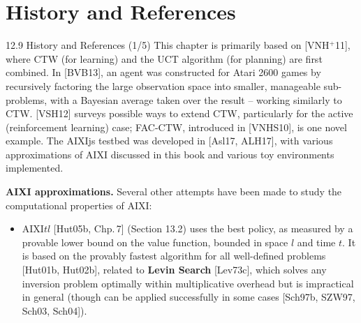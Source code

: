 \documentclass[aspectratio=169,10pt]{beamer}
\begin{document}
\section{History and References}

\begin{frame}{12.9 History and References (1/5)}
This chapter is primarily based on [VNH$^+$11], where CTW (for learning) and the UCT
algorithm (for planning) are first combined. In [BVB13], an agent was constructed for
Atari 2600 games by recursively factoring the large observation space into smaller,
manageable sub-problems, with a Bayesian average taken over the result -- working
similarly to CTW. [VSH12] surveys possible ways to extend CTW, particularly for the active
(reinforcement learning) case; FAC-CTW, introduced in [VNHS10], is one novel example. The
AIXIjs testbed was developed in [Asl17, ALH17], with various approximations of AIXI
discussed in this book and various toy environments implemented.

\textbf{AIXI approximations.} Several other attempts have been made to study the
computational properties of AIXI:
\begin{itemize}
\item AIXI$tl$ [Hut05b, Chp.\,7] (Section 13.2) uses the best policy, as measured by a
provable lower bound on the value function, bounded in space $l$ and time $t$. It is
based on the provably fastest algorithm for all well-defined problems [Hut01b, Hut02b],
related to \textbf{Levin Search} [Lev73c], which solves any inversion problem optimally
within multiplicative overhead but is impractical in general (though can be applied
successfully in some cases [Sch97b, SZW97, Sch03, Sch04]).
\end{itemize}
\end{frame}
\end{document}
